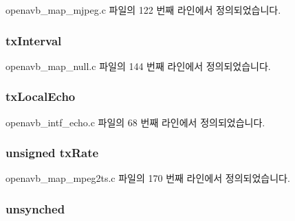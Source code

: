 openavb\+\_\+map\+\_\+mjpeg.\+c 파일의 122 번째 라인에서 정의되었습니다.

\subsubsection[{\texorpdfstring{tx\+Interval}{txInterval}}]{ tx\+Interval}\hypertarget{structpvt__data__t_abb67a593d59c479e632685a33c092a32}{}\label{structpvt__data__t_abb67a593d59c479e632685a33c092a32}


openavb\+\_\+map\+\_\+null.\+c 파일의 144 번째 라인에서 정의되었습니다.

\subsubsection[{\texorpdfstring{tx\+Local\+Echo}{txLocalEcho}}]{ tx\+Local\+Echo}\hypertarget{structpvt__data__t_a1c90c5334aaeeea944e9bde22fa4e91d}{}\label{structpvt__data__t_a1c90c5334aaeeea944e9bde22fa4e91d}


openavb\+\_\+intf\+\_\+echo.\+c 파일의 68 번째 라인에서 정의되었습니다.

\subsubsection[{\texorpdfstring{tx\+Rate}{txRate}}]{\setlength{\rightskip}{0pt plus 5cm}unsigned tx\+Rate}\hypertarget{structpvt__data__t_a7116917d87be1a193afaeacadc5cba23}{}\label{structpvt__data__t_a7116917d87be1a193afaeacadc5cba23}


openavb\+\_\+map\+\_\+mpeg2ts.\+c 파일의 170 번째 라인에서 정의되었습니다.

\subsubsection[{\texorpdfstring{unsynched}{unsynched}}]{ unsynched}\hypertarget{structpvt__data__t_ae7568439e6b9a531ade2d14701a07662}{}\label{structpvt__data__t_ae7568439e6b9a531ade2d14701a07662}


